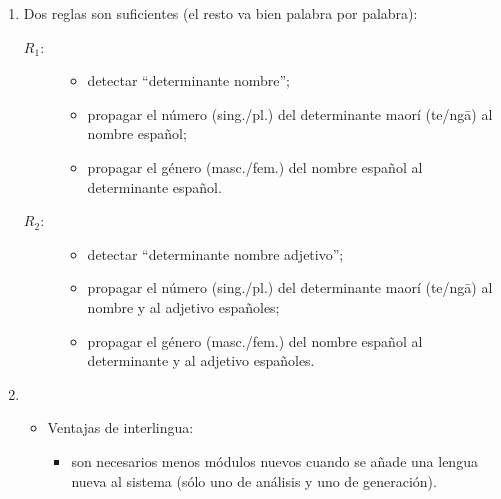 \begin{enumerate}
\item Dos reglas son suficientes (el resto va bien palabra por palabra): 

\begin{description} \item[$R_1$:] 

\begin{itemize} \item detectar ``determinante nombre''; \item propagar el número (sing./pl.) del determinante maorí (te/ng\={a}) al nombre español; \item propagar el género (masc./fem.) del nombre español al determinante español. \end{itemize} \item[$R_2$:] \begin{itemize} \item detectar ``determinante nombre adjetivo''; \item propagar el número (sing./pl.) del determinante maorí (te/ng\={a}) al nombre y al adjetivo españoles; \item propagar el género (masc./fem.) del nombre español al determinante y al adjetivo españoles. \end{itemize} \end{description} \item

\begin{itemize} \item Ventajas de interlingua: \begin{itemize} \item son necesarios menos módulos nuevos cuando se añade una lengua nueva al sistema (sólo uno de análisis y uno de generación). 


\end{itemize}
\end{itemize}
\end{enumerate}
